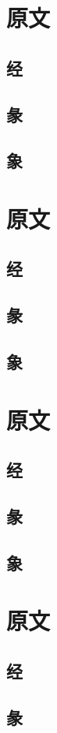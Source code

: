 \documentclass[12pt,oneside]{book}
\begin{document}
\section{原文}
\subsection{经}
\subsection{彖}
\subsection{象}

\section{原文}
\subsection{经}
\subsection{彖}
\subsection{象}

\section{原文}
\subsection{经}
\subsection{彖}
\subsection{象}

\section{原文}
\subsection{经}
\subsection{彖}
\end{document}
